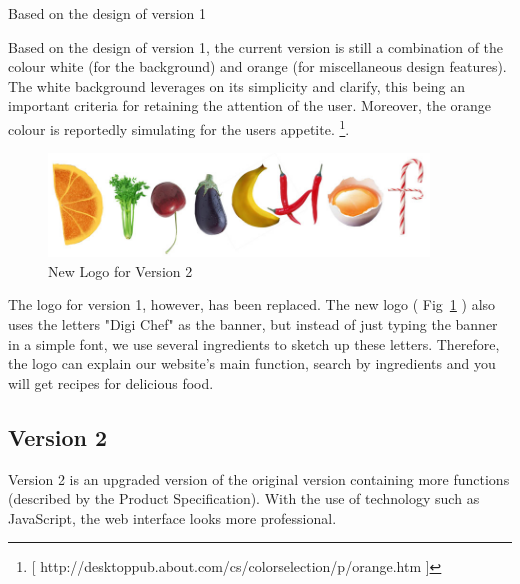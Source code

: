 Based on the design of version 1


Based on the design of version 1, the current version is still a combination of the colour white (for the background) and orange (for miscellaneous design features). The white background leverages on its simplicity and clarify, this being an important criteria for retaining the attention of the user. Moreover, the orange colour is reportedly simulating for the users appetite. \footnote{[ http://desktoppub.about.com/cs/colorselection/p/orange.htm ]}. 

\begin{figure}[h]
\begin{center}
\includegraphics[width=0.9\textwidth]{logowebsite}
\caption{New Logo for Version 2}
\label{fig:logowebsite}
\end{center}
\end{figure}

The logo for version 1, however, has been replaced. The new logo ( Fig~\ref{fig:logowebsite} ) also uses the letters "Digi Chef" as the banner, but instead of just typing the banner in a simple font, we use several ingredients to sketch up these letters. Therefore, the logo can explain our website's main function, search by ingredients and you will get  recipes for delicious food. 

\subsection{Version 2}

Version 2 is an upgraded version of the original version containing more functions (described by the Product Specification). With the use of technology such as JavaScript, the web interface looks more professional. 

